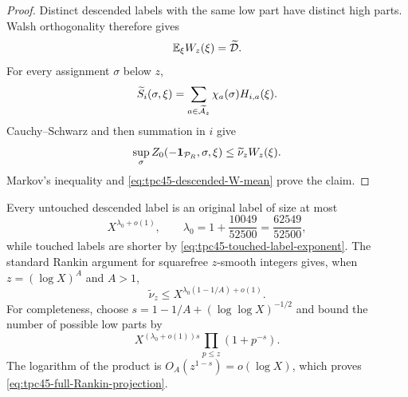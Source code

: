 \begin{proof}
Distinct descended labels with the same low part have distinct high
parts.  Walsh orthogonality therefore gives
\begin{equation}
 \mathbb E_\xi W_z(\xi)=\widetilde{\mathcal D}.
 \label{eq:tpc45-descended-W-mean}
\end{equation}
For every assignment \(\sigma\) below \(z\),
\begin{equation}
 \widetilde S_i(\sigma,\xi)
 =\sum_{a\in\widetilde{\mathcal A}_z}\chi_a(\sigma)H_{i,a}(\xi).
 \label{eq:tpc45-descended-coordinate-grouping}
\end{equation}
Cauchy--Schwarz and then summation in \(i\) give
\begin{equation}
 \sup_\sigma Z_0(-\mathbf 1_{\mathcal P_R},\sigma,\xi)
 \le\widetilde\nu_zW_z(\xi).
 \label{eq:tpc45-descended-face-Cauchy}
\end{equation}
Markov's inequality and \eqref{eq:tpc45-descended-W-mean} prove the
claim.
\end{proof}

Every untouched descended label is an original label of size at most
\begin{equation}
 X^{\lambda_0+o(1)},
 \qquad
 \lambda_0=1+\frac{10049}{52500}
 =\frac{62549}{52500},
 \label{eq:tpc45-full-descended-label-size}
\end{equation}
while touched labels are shorter by
\eqref{eq:tpc45-touched-label-exponent}.  The standard Rankin argument
for squarefree \(z\)-smooth integers gives, when
\(z=(\log X)^A\) and \(A>1\),
\begin{equation}
 \widetilde\nu_z
 \le X^{\lambda_0(1-1/A)+o(1)}.
 \label{eq:tpc45-full-Rankin-projection}
\end{equation}
For completeness, choose
\(s=1-1/A+(\log\log X)^{-1/2}\) and bound the number of possible low
parts by
\begin{equation}
 X^{(\lambda_0+o(1))s}
 \prod_{p\le z}(1+p^{-s}).
 \label{eq:tpc45-Rankin-product}
\end{equation}
The logarithm of the product is
\(O_A(z^{1-s})=o(\log X)\), which proves
\eqref{eq:tpc45-full-Rankin-projection}.

